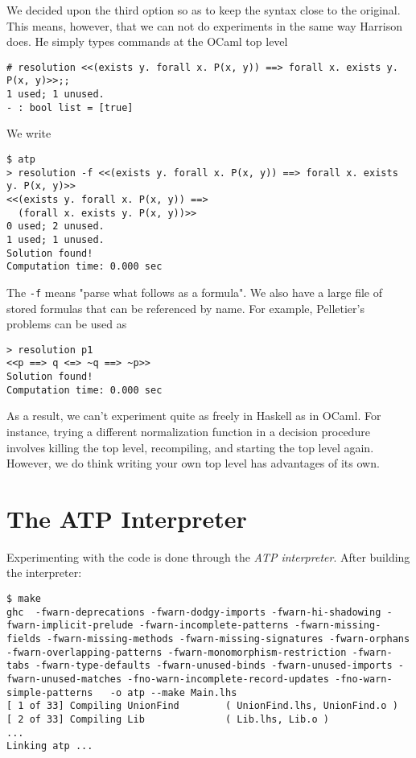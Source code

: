 \documentclass{article}
\begin{document}
\noindent We decided upon the third option so as to keep the syntax close
to the original.  This means, however, that we can not do 
experiments in the same way Harrison does.  He simply types 
commands at the OCaml top level

\begin{verbatim} 
# resolution <<(exists y. forall x. P(x, y)) ==> forall x. exists y. P(x, y)>>;; 
1 used; 1 unused.
- : bool list = [true]
\end{verbatim} 

\noindent We write

\begin{verbatim} 
$ atp
> resolution -f <<(exists y. forall x. P(x, y)) ==> forall x. exists y. P(x, y)>>
<<(exists y. forall x. P(x, y)) ==>
  (forall x. exists y. P(x, y))>>
0 used; 2 unused.
1 used; 1 unused.
Solution found!
Computation time: 0.000 sec
\end{verbatim} 

\noindent The \texttt{-f} means "parse what follows as a formula".  We also have
a large file of stored formulas that can be referenced by name.  For 
example, Pelletier's problems can be used as

\begin{verbatim} 
> resolution p1
<<p ==> q <=> ~q ==> ~p>>
Solution found!
Computation time: 0.000 sec
\end{verbatim} 

\noindent As a result, we can't experiment quite as freely in Haskell as in
OCaml.  For instance, trying a different normalization function
in a decision procedure involves killing the top level, recompiling,
and starting the top level again.  However, we do think writing your
own top level has advantages of its own.  

\section{The ATP Interpreter}

Experimenting with the code is done through the \emph{ATP interpreter}.
After building the interpreter:

\begin{verbatim} 
$ make
ghc  -fwarn-deprecations -fwarn-dodgy-imports -fwarn-hi-shadowing -fwarn-implicit-prelude -fwarn-incomplete-patterns -fwarn-missing-fields -fwarn-missing-methods -fwarn-missing-signatures -fwarn-orphans -fwarn-overlapping-patterns -fwarn-monomorphism-restriction -fwarn-tabs -fwarn-type-defaults -fwarn-unused-binds -fwarn-unused-imports -fwarn-unused-matches -fno-warn-incomplete-record-updates -fno-warn-simple-patterns   -o atp --make Main.lhs 
[ 1 of 33] Compiling UnionFind        ( UnionFind.lhs, UnionFind.o )
[ 2 of 33] Compiling Lib              ( Lib.lhs, Lib.o )
...
Linking atp ...
\end{verbatim} 
\end{document}
